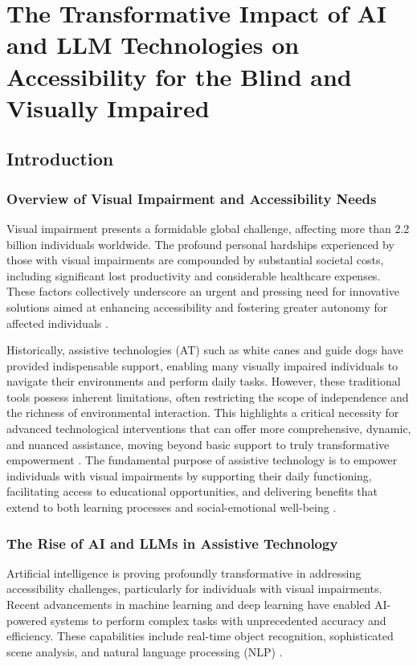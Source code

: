 \chapter{The Transformative Impact of AI and LLM Technologies on Accessibility for the Blind and Visually Impaired}\label{ch9:ai-llm}
\raggedright

\section{Introduction}\label{ch9:sec:introduction}

\subsection{Overview of Visual Impairment and Accessibility Needs}\label{ch9:ssec:overview}
Visual impairment presents a formidable global challenge, affecting more than 2.2 billion individuals worldwide. The profound personal hardships experienced by those with visual impairments are compounded by substantial societal costs, including significant lost productivity and considerable healthcare expenses. These factors collectively underscore an urgent and pressing need for innovative solutions aimed at enhancing accessibility and fostering greater autonomy for affected individuals \supercite{arxiv_visual_impairment}.

Historically, assistive technologies (AT) such as white canes and guide dogs have provided indispensable support, enabling many visually impaired individuals to navigate their environments and perform daily tasks. However, these traditional tools possess inherent limitations, often restricting the scope of independence and the richness of environmental interaction. This highlights a critical necessity for advanced technological interventions that can offer more comprehensive, dynamic, and nuanced assistance, moving beyond basic support to truly transformative empowerment \supercite{aimodels2024}. The fundamental purpose of assistive technology is to empower individuals with visual impairments by supporting their daily functioning, facilitating access to educational opportunities, and delivering benefits that extend to both learning processes and social-emotional well-being \supercite{wjaets2024}.

\subsection{The Rise of AI and LLMs in Assistive Technology}\label{ch9:ssec:rise-of-ai}
Artificial intelligence is proving profoundly transformative in addressing accessibility challenges, particularly for individuals with visual impairments. Recent advancements in machine learning and deep learning have enabled AI-powered systems to perform complex tasks with unprecedented accuracy and efficiency. These capabilities include real-time object recognition, sophisticated scene analysis, and natural language processing (NLP) \supercite{arxiv_visual_impairment}.

